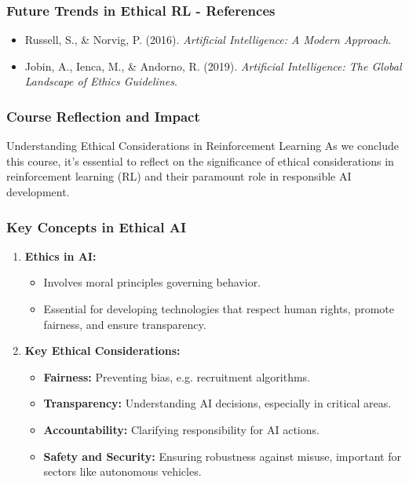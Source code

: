 \documentclass{beamer}
\begin{document}
\begin{frame}[fragile]
    \frametitle{Future Trends in Ethical RL - References}
    \begin{itemize}
        \item Russell, S., \& Norvig, P. (2016). \textit{Artificial Intelligence: A Modern Approach}.
        \item Jobin, A., Ienca, M., \& Andorno, R. (2019). \textit{Artificial Intelligence: The Global Landscape of Ethics Guidelines}.
    \end{itemize}
\end{frame}

\begin{frame}[fragile]
    \frametitle{Course Reflection and Impact}
    \begin{block}{Understanding Ethical Considerations in Reinforcement Learning}
        As we conclude this course, it's essential to reflect on the significance of ethical considerations in reinforcement learning (RL) and their paramount role in responsible AI development.
    \end{block}
\end{frame}

\begin{frame}[fragile]
    \frametitle{Key Concepts in Ethical AI}

    \begin{enumerate}
        \item \textbf{Ethics in AI:}
            \begin{itemize}
                \item Involves moral principles governing behavior.
                \item Essential for developing technologies that respect human rights, promote fairness, and ensure transparency.
            \end{itemize}

        \item \textbf{Key Ethical Considerations:}
            \begin{itemize}
                \item \textbf{Fairness:} Preventing bias, e.g. recruitment algorithms.
                \item \textbf{Transparency:} Understanding AI decisions, especially in critical areas.
                \item \textbf{Accountability:} Clarifying responsibility for AI actions.
                \item \textbf{Safety and Security:} Ensuring robustness against misuse, important for sectors like autonomous vehicles.
            \end{itemize}
    \end{enumerate}
\end{frame}
\end{document}
